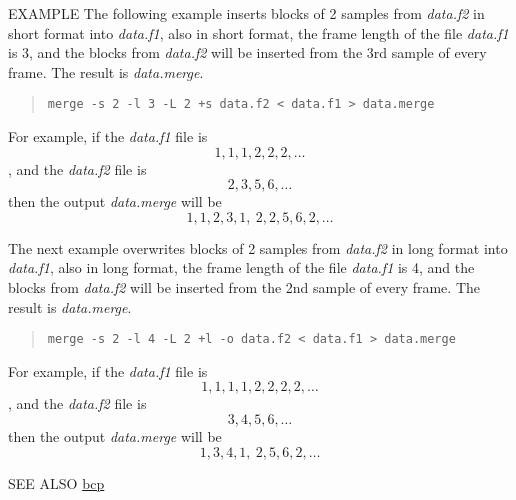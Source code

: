 \begin{qsection}{EXAMPLE}
The following example inserts blocks of 2 samples from {\em data.f2}
in short format into {\em data.f1}, also in short format,
the frame length of the file {\em data.f1} is 3, and the blocks
from {\em data.f2} will be inserted from the 3rd sample of
every frame.
The result is {\em data.merge}.
\begin{quote}
 \verb!merge -s 2 -l 3 -L 2 +s data.f2 < data.f1 > data.merge!
\end{quote}
For example, if the {\em data.f1} file is 
\[ 1,1,1,2,2,2,\dots \], 
and the {\em data.f2} file is 
\[ 2,3,5,6,\dots \]
then the output {\em data.merge} will be 
\[ 1,1,2,3,1,~ 2,2,5,6,2,\dots \] 

The next example overwrites blocks of 2 samples from {\em data.f2}
in long format into {\em data.f1}, also in long format,
the frame length of the file {\em data.f1} is 4, and the blocks
from {\em data.f2} will be inserted from the 2nd sample of
every frame.
The result is {\em data.merge}.
\begin{quote}
 \verb!merge -s 2 -l 4 -L 2 +l -o data.f2 < data.f1 > data.merge!
\end{quote}
For example, if the {\em data.f1} file is 
\[ 1,1,1,1,2,2,2,2,\dots \], 
and the {\em data.f2} file is 
\[ 3,4,5,6,\dots \]
then the output {\em data.merge} will be 
\[  1,3,4,1,~ 2,5,6,2,\dots \] 

\end{qsection}

\begin{qsection}{SEE ALSO}
\hyperlink{bcp}{bcp}
\end{qsection}
